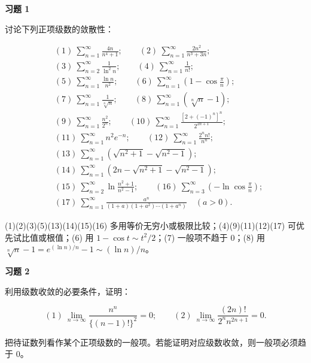 \begin{exercisebox}
\textbf{习题 1 }

讨论下列正项级数的敛散性：

\[
      \begin{aligned}
      &(1)\ \sum_{n=1}^{\infty}\frac{4n}{n^4+1};\qquad
      (2)\ \sum_{n=1}^{\infty}\frac{2n^2}{n^3+3n};\\
      &(3)\ \sum_{n=2}^{\infty}\frac1{\ln^2 n};\qquad
      (4)\ \sum_{n=1}^{\infty}\frac1{n!};\\
      &(5)\ \sum_{n=1}^{\infty}\frac{\ln n}{n^2};\qquad
      (6)\ \sum_{n=1}^{\infty}\left(1-\cos\frac{\pi}{n}\right);\\
      &(7)\ \sum_{n=1}^{\infty}\frac1{\sqrt[n]{n}};\qquad
      (8)\ \sum_{n=1}^{\infty}\left(\sqrt[n]{n}-1\right);\\
      &(9)\ \sum_{n=1}^{\infty}\frac{n^2}{2^n};\qquad
      (10)\ \sum_{n=1}^{\infty}\frac{\left[2+(-1)^n\right]^n}{2^{2n+1}};\\
      &(11)\ \sum_{n=1}^{\infty}n^2e^{-n};\qquad
      (12)\ \sum_{n=1}^{\infty}\frac{2^n n!}{n^n};\\
      &(13)\ \sum_{n=1}^{\infty}\left(\sqrt{n^2+1}-\sqrt{n^2-1}\right);\\
      &(14)\ \sum_{n=1}^{\infty}\left(2n-\sqrt{n^2+1}-\sqrt{n^2-1}\right);\\
      &(15)\ \sum_{n=2}^{\infty}\ln\frac{n^2+1}{n^2-1};\qquad
      (16)\ \sum_{n=3}^{\infty}\left(-\ln\cos\frac{\pi}{n}\right);\\
      &(17)\ \sum_{n=1}^{\infty}\frac{a^n}{(1+a)(1+a^2)\cdots(1+a^n)}\quad (a>0).
      \end{aligned}
      \]

\begin{hintbox}
(1)(2)(3)(5)(13)(14)(15)(16) 多用等价无穷小或极限比较；(4)(9)(11)(12)(17) 可优先试比值或根值；(6) 用 \(1-\cos t\sim t^2/2\)；(7) 一般项不趋于 \(0\)；(8) 用 \(\sqrt[n]{n}-1=e^{(\ln n)/n}-1\sim(\ln n)/n\)。
\end{hintbox}
\end{exercisebox}

\begin{exercisebox}
\textbf{习题 2 }

利用级数收敛的必要条件，证明：

\[
      (1)\ \lim_{n\to\infty}\frac{n^n}{\{(n-1)!\}^2}=0;\qquad
      (2)\ \lim_{n\to\infty}\frac{(2n)!}{2^n n^{2n+1}}=0.
      \]

\begin{hintbox}
把待证数列看作某个正项级数的一般项。若能证明对应级数收敛，则一般项必须趋于 \(0\)。
\end{hintbox}
\end{exercisebox}

